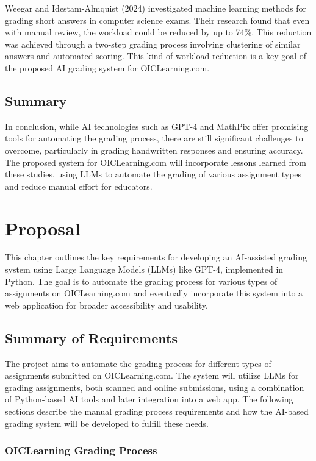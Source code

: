 \documentclass[ms,twoside,print]{nuthesis}
\begin{document}
Weegar and Idestam-Almquist (2024) \cite{Weegar2024} investigated machine learning methods for grading short answers in computer science exams. Their research found that even with manual review, the workload could be reduced by up to 74\%. This reduction was achieved through a two-step grading process involving clustering of similar answers and automated scoring. This kind of workload reduction is a key goal of the proposed AI grading system for OICLearning.com.

\section{Summary}

In conclusion, while AI technologies such as GPT-4 and MathPix offer promising tools for automating the grading process, there are still significant challenges to overcome, particularly in grading handwritten responses and ensuring accuracy. The proposed system for OICLearning.com will incorporate lessons learned from these studies, using LLMs to automate the grading of various assignment types and reduce manual effort for educators.

\chapter{Proposal}

This chapter outlines the key requirements for developing an AI-assisted grading system using Large Language Models (LLMs) like GPT-4, implemented in Python. The goal is to automate the grading process for various types of assignments on OICLearning.com and eventually incorporate this system into a web application for broader accessibility and usability.

\section{Summary of Requirements}

The project aims to automate the grading process for different types of assignments submitted on OICLearning.com. The system will utilize LLMs for grading assignments, both scanned and online submissions, using a combination of Python-based AI tools and later integration into a web app. The following sections describe the manual grading process requirements and how the AI-based grading system will be developed to fulfill these needs.

\subsection{OICLearning Grading Process}
\end{document}
